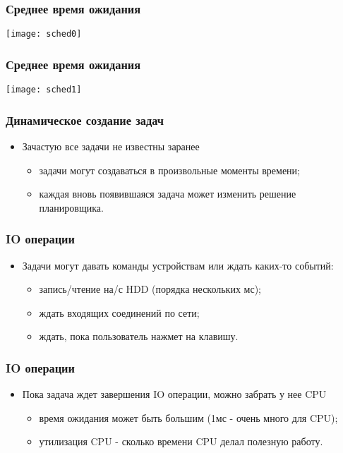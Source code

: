 \begin{frame}
\frametitle{Среднее время ожидания}
\texttt{[image: sched0]}
\end{frame}

\begin{frame}
\frametitle{Среднее время ожидания}
\texttt{[image: sched1]}
\end{frame}

\begin{frame}
\frametitle{Динамическое создание задач}
\begin{itemize}
    \item<1->Зачастую все задачи не известны заранее
    \begin{itemize}
        \item<2->задачи могут создаваться в произвольные моменты времени;
        \item<3->каждая вновь появившаяся задача может изменить решение
             планировщика.
    \end{itemize}
\end{itemize}
\end{frame}

\begin{frame}
\frametitle{IO операции}
\begin{itemize}
    \item<1->Задачи могут давать команды устройствам или ждать каких-то событий:
    \begin{itemize}
        \item<2->запись/чтение на/с HDD (порядка нескольких мс);
        \item<3->ждать входящих соединений по сети;
        \item<4->ждать, пока пользователь нажмет на клавишу.
    \end{itemize}
\end{itemize}
\end{frame}

\begin{frame}
\frametitle{IO операции}
\begin{itemize}
    \item<1->Пока задача ждет завершения IO операции, можно забрать у нее CPU
    \begin{itemize}
        \item<2->время ожидания может быть большим (1мс - очень много для CPU);
        \item<3->утилизация CPU - сколько времени CPU делал полезную работу.
    \end{itemize}
\end{itemize}
\end{frame}

